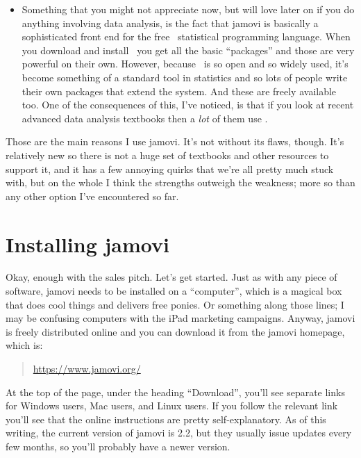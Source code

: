 \begin{itemize}
\item Something that you might not appreciate now, but will love later on if you do anything involving data analysis, is the fact that jamovi is basically a sophisticated front end for the free \R\ statistical programming language. When you download and install \R\ you get all the basic ``packages'' and those are very powerful on their own. However, because \R\ is so open and so widely used, it's become something of a standard tool in statistics and so lots of people write their own packages that extend the system. And these are freely available too. One of the consequences of this, I've noticed, is that if you look at recent advanced data analysis textbooks then a {\it lot} of them use \R. 
\end{itemize}
Those are the main reasons I use jamovi. It's not without its flaws, though. It's relatively new so there is not a huge set of textbooks and other resources to support it, and it has a few annoying quirks that we're all pretty much stuck with, but on the whole I think the strengths outweigh the weakness; more so than any other option I've encountered so far. 


\section{Installing jamovi \label{sec:gettingjamovi}}

Okay, enough with the sales pitch. Let's get started. Just as with any piece of software,  jamovi needs to be installed on a ``computer'', which is a magical box that does cool things and delivers free ponies. Or something along those lines; I may be confusing computers with the iPad marketing campaigns. Anyway, jamovi is freely distributed online and you can download it from the jamovi homepage, which is:
\begin{quote}
\url{https://www.jamovi.org/}
\end{quote}
At the top of the page, under the heading ``Download'', you'll see separate links for Windows users, Mac users, and Linux users. If you follow the relevant link you'll see that the online instructions are pretty self-explanatory. As of this writing, the current version of  jamovi is 2.2, but they usually issue updates every few months, so you'll probably have a newer version.

